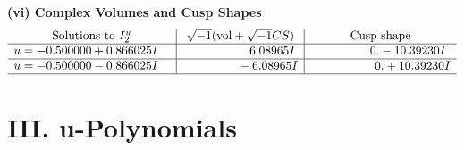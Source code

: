\documentclass[1p]{elsarticle_modified}
\theoremstyle{definition}
\newcommand{\I}{\sqrt{-1}}
\begin{document}
\newpage\flushleft \textbf{(vi) Complex Volumes and Cusp Shapes}
$$\begin{array}{c|c|c}  
\text{Solutions to }I^u_{2}& \I (\text{vol} + \sqrt{-1}CS) & \text{Cusp shape}\\
 \hline 
\begin{aligned}
u &= -0.500000 + 0.866025 I\end{aligned}
 & \phantom{-0.000000 -}6.08965 I & \phantom{-0.000000 } 0. - 10.39230 I \\ \hline\begin{aligned}
u &= -0.500000 - 0.866025 I\end{aligned}
 & \phantom{-0.000000 } -6.08965 I & \phantom{-0.000000 -}0. + 10.39230 I\\
 \hline 
 \end{array}$$\newpage
\newpage\renewcommand{\arraystretch}{1}
\centering \section*{ III. u-Polynomials}
\end{document}
